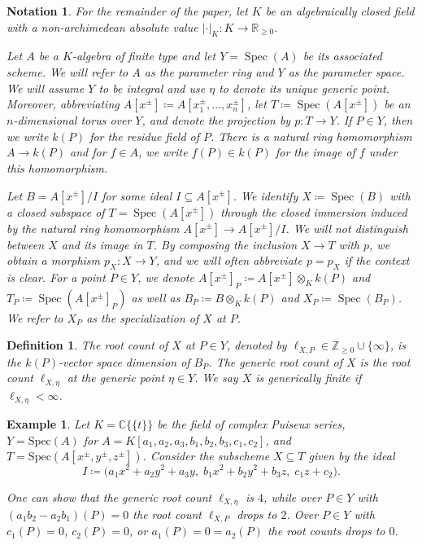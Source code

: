 \documentclass[12pt,reqno,a4paper]{amsart}
\theoremstyle{theoremstyle}
\theoremstyle{examplestyle}
\newtheorem{example}[theorem]{Example}
\newtheorem{definition}[theorem]{Definition}
\newtheorem{notation}[theorem]{Notation}
\theoremstyle{algorithmstyle}
\newcommand{\RR}{\mathbb{R}}
\newcommand{\ZZ}{\mathbb{Z}}
\DeclareMathOperator{\Spec}{Spec}
\begin{document}
\begin{notation}\label{con:mainConvention}
  For the remainder of the paper, let $K$ be an algebraically closed field with a non-archimedean absolute value $|\cdot|_K\colon K\rightarrow\RR_{\geq 0}$.

  Let $A$ be a $K$-algebra of finite type and let $Y=\Spec(A)$ be its associated scheme.  We will refer to $A$ as the \emph{parameter ring} and $Y$ as the \emph{parameter space}.  We will assume $Y$ to be integral and use $\eta$ to denote its unique generic point.  Moreover, abbreviating $A[x^\pm]\coloneqq A[x_1^\pm,\dots,x_n^\pm]$, let $T\coloneqq \Spec(A[x^\pm])$ be an $n$-dimensional torus over $Y$, and denote the projection by $p\colon T\rightarrow Y$. If $P\in Y$, then we write $k(P)$ for the residue field of $P$. There is a natural ring homomorphism $A\to k(P)$ and for $f\in{A}$, we write $f(P)\in k(P)$ for the image of $f$ under this homomorphism.

  Let $B=A[x^\pm]/I$ for some ideal $I\subseteq A[x^\pm]$. We identify $X\coloneqq \Spec(B)$ with a closed subspace of $T=\Spec(A[x^{\pm}])$ through the closed immersion induced by the natural ring homomorphism $A[x^{\pm}]\to A[x^{\pm}]/I$. We will not distinguish between $X$ and its image in $T$.  %
  By composing the inclusion $X\to T$ with $p$, we obtain a morphism $p_{X}\colon X\to Y$, and we will often abbreviate $p=p_X$ if the context is clear.
  For a point $P\in Y$, we denote $A[x^\pm]_P\coloneqq A[x^\pm]\otimes_K k(P)$ and $T_P\coloneqq \Spec(A[x^\pm]_P)$ as well as $B_P\coloneqq B\otimes_K k(P)$ and $X_P\coloneqq \Spec(B_P)$. We refer to $X_P$ as the \emph{specialization} of $X$ at $P$.
\end{notation}

\begin{definition}
  The \emph{root count} of $X$ at $P\in Y$, denoted by $\ell_{X,P}\in\ZZ_{\geq 0}\cup\{\infty\}$, is the $k(P)$-vector space dimension  of $B_{P}$.
  The \emph{generic root count} of $X$ is the root count $\ell_{X,\eta}$ at the generic point $\eta\in Y$.  We say $X$ is \emph{generically finite} if $\ell_{X,\eta}<\infty$.
\end{definition}

\begin{example}\label{ex:runningExampleGenericRootCount}
  Let $K=\mathbb{C}\{\!\{t\}\!\}$ be the field of complex Puiseux series, $Y=\mathrm{Spec}(A)$ for $A=K[a_1,a_2,a_3,b_1,b_2,b_3,c_1,c_2]$, and $T=\mathrm{Spec}(A[x^{\pm},y^{\pm},z^{\pm}])$.  Consider the subscheme $X \subseteq T$  given by the ideal
  \begin{equation*}
    I\coloneqq \big( a_1x^2+a_2y^2+a_3y,\; b_1x^2+b_2y^2+b_3z,\; c_1z+c_2 \big).
  \end{equation*}

  One can show that the generic root count $\ell_{X,\eta}$ is $4$, while over $P\in Y$ with $(a_1b_2-a_2b_1)(P)=0$ the root count $\ell_{X,P}$ drops to $2$.  Over $P\in Y$ with $c_1(P)=0$, $c_2(P)=0$, or $a_1(P)=0=a_2(P)$ the root counts drops to $0$.
\end{example}
\end{document}
